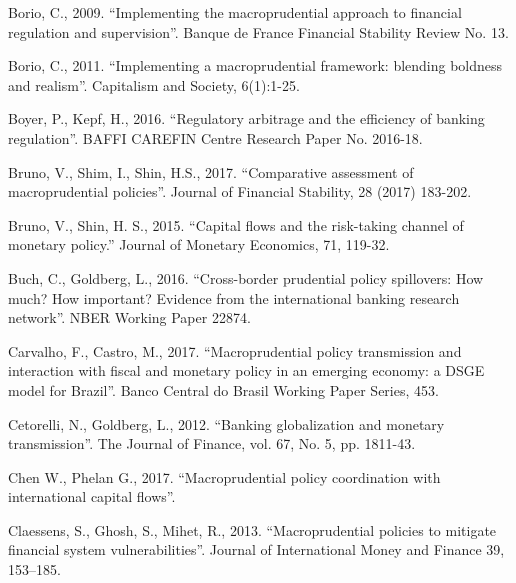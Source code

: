 \documentclass[12pt,a4paper]{article}
\begin{document}
Borio, C., 2009. “Implementing the macroprudential approach to financial regulation and supervision”. Banque de France Financial Stability Review No. 13.

Borio, C., 2011. “Implementing a macroprudential framework: blending boldness and realism”. Capitalism and Society, 6(1):1-25.

Boyer, P., Kepf, H., 2016. “Regulatory arbitrage and the efficiency of banking regulation”. BAFFI CAREFIN Centre Research Paper No. 2016-18.

Bruno, V., Shim, I., Shin, H.S., 2017. “Comparative assessment of macroprudential policies”. Journal of Financial Stability, 28 (2017) 183-202.

Bruno, V., Shin, H. S., 2015. “Capital flows and the risk-taking channel of monetary policy.” Journal of Monetary Economics, 71, 119-32.

Buch, C., Goldberg, L., 2016. “Cross-border prudential policy spillovers: How much? How important? Evidence from the international banking research network”. NBER Working Paper 22874.


Carvalho, F., Castro, M., 2017. “Macroprudential policy transmission and interaction with fiscal and monetary policy in an emerging economy: a DSGE model for Brazil”. Banco Central do Brasil Working Paper Series, 453.


Cetorelli, N., Goldberg, L., 2012. “Banking globalization and monetary transmission”. The Journal of Finance, vol. 67, No. 5, pp. 1811-43.

Chen W., Phelan G., 2017. “Macroprudential policy coordination with international capital flows”. 


Claessens, S., Ghosh, S., Mihet, R., 2013. “Macroprudential policies to mitigate financial
system vulnerabilities”. Journal of International Money and Finance 39, 153–185.

\end{document}
